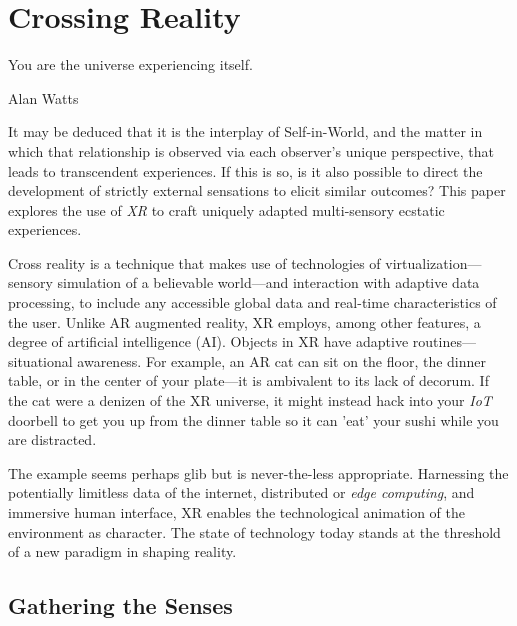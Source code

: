\documentclass{UIdahoMastersThesis}
\begin{document}
\chapter{Crossing Reality}
\label{Chapter:CrossingReality}
\epigraph {You are the universe experiencing itself.}{Alan Watts}

\vspace{9mm}

It may be deduced that it is the interplay of Self-in-World, and the matter in which that relationship is observed via each observer's unique perspective, that leads to transcendent experiences. If this is so, is it also possible to direct the development of strictly external sensations to elicit similar outcomes? This paper explores the use of \textit{\ac{XR}} to craft uniquely adapted multi-sensory ecstatic experiences.

Cross reality is a technique that makes use of technologies of virtualization---sensory simulation of a believable world---and interaction with adaptive data processing, to include any accessible global data and real-time characteristics of the user. Unlike AR augmented reality, XR employs, among other features, a degree of artificial intelligence (AI). Objects in XR have adaptive routines---situational awareness. For example, an AR cat can sit on the floor, the dinner table, or in the center of your plate---it is ambivalent to its lack of decorum. If the cat were a denizen of the \ac{XR} universe, it might instead hack into your \textit{\ac{IoT}} doorbell to get you up from the dinner table so it can 'eat' your sushi while you are distracted.

The example seems perhaps glib but is never-the-less appropriate. Harnessing the potentially limitless data of the internet, distributed or \emph{edge computing}, and immersive human interface, \ac{XR} enables the technological animation of the environment as character. The state of technology today stands at the threshold of a new paradigm in shaping reality.


\section{Gathering the Senses}
\end{document}
